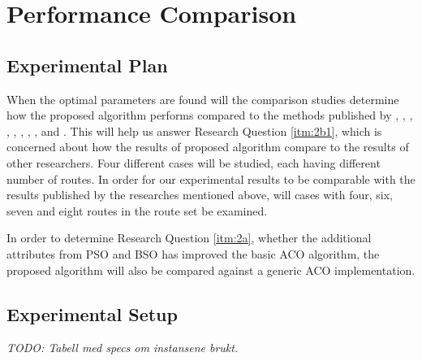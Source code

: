 \section{Performance Comparison}
\label{sec:performanceComparison}
\subsection{Experimental Plan}
When the optimal parameters are found will the comparison studies determine how the proposed algorithm performs compared to the methods published by \citet{mandl79}, \citet{kechagiopoulos14}, \citet{nikolic14}, \citet{kidwai98}, \citet{fan10}, \citet{chakroborty02}, \citet{zhang10}, \citet{chew12}, and \citet{baaj91}. This will help us answer Research Question \vref{itm:2b1}, which is concerned about how the results of proposed algorithm compare to the results of other researchers. Four different cases will be studied, each having different number of routes. In order for our experimental results to be comparable with the results published by the researches mentioned above, will cases with four, six, seven and eight routes in the route set be examined.

In order to determine Research Question \vref{itm:2a}, whether the additional attributes from PSO and BSO has improved the basic ACO algorithm, the proposed algorithm will also be compared against a generic ACO implementation.


\subsection{Experimental Setup}
\label{subsec:performanceComparison_setup}
\emph{\color{blue} TODO: Tabell med specs om instansene brukt.}

